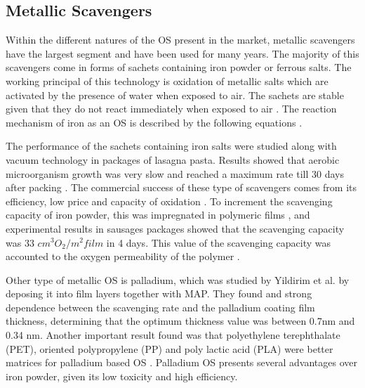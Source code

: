 \begin{refsection}
\subsection{Metallic Scavengers}\label{subsec:metallic_os}
Within the different natures of the OS present in the market, metallic scavengers have the largest segment and have been used for many years. The majority of this scavengers come in forms of sachets containing iron powder or ferrous salts. The working principal of this technology is oxidation of 
metallic salts which are activated by the presence of water when exposed to air. The sachets are stable given that they do not react immediately when exposed to air \cite{SouzaCruz2005AbsorvedoresRevisao}. The reaction mechanism of iron as an OS is described by the following equations \cites{Souza2012OxygenPreservation}{Dey2019OxygenReview}{cruz2012oxygen}. 


The performance of the sachets containing iron salts were studied along with vacuum technology in packages of lasagna pasta. Results showed that aerobic microorganism growth was very slow and reached a maximum rate till 30 days after packing \cite{Cruz2006EvaluationPacked}. The commercial success of these type of scavengers comes from its efficiency, low price and capacity of oxidation \cite{Gaikwad2018OxygenPackaging}. To increment the scavenging capacity of iron powder, this was impregnated in polymeric films
, and experimental results in sausages packages showed that the scavenging capacity was 33 $cm^3 O_2/m^2 film$ in 4 days. This value of the scavenging capacity  was accounted to the oxygen permeability of the polymer \cite{Gibis2011OxygenApplication}. 

Other type of metallic OS is palladium, which was studied by Yildirim et al. \cite{Yildirim2015DevelopmentThickness} by deposing it into film layers together with MAP. They found and strong dependence between the scavenging rate and the palladium coating film thickness, determining that the optimum thickness value was  between 0.7nm  and 0.34 nm. Another important result found was that polyethylene terephthalate (PET), oriented polypropylene (PP) and  poly lactic acid (PLA) were better matrices for palladium based OS \cite{Gaikwad2018OxygenPackaging}. Palladium OS presents several  advantages over iron powder, given its low toxicity and high efficiency.


\end{refsection}
